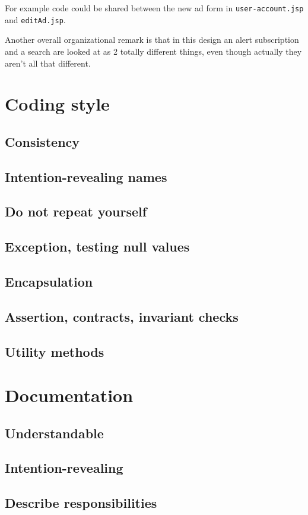 \documentclass[a4wide]{article}
\begin{document}
For example code could be shared between the new ad form in \texttt{user-account.jsp} and \texttt{editAd.jsp}. 

Another overall organizational remark is that in this design an alert subscription and a search are looked at as 2 totally different things, even though actually they aren't all that different. 

\section{Coding style}
\subsection{Consistency}
\subsection{Intention-revealing names}
\subsection{Do not repeat yourself}
\subsection{Exception, testing null values}
\subsection{Encapsulation}
\subsection{Assertion, contracts, invariant checks}
\subsection{Utility methods}
\section{Documentation}
\subsection{Understandable}
\subsection{Intention-revealing}
\subsection{Describe responsibilities}
\end{document}
